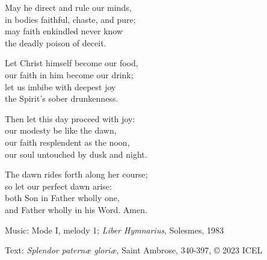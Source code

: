 \hymn



\begin{underhymnverse}
May he direct and rule our minds,\\
in bodies faithful, chaste, and pure;\\
may faith enkindled never know\\
the deadly poison of deceit.

Let Christ himself become our food,\\
our faith in him become our drink;\\
let us imbibe with deepest joy\\
the Spirit’s sober drunkenness.

Then let this day proceed with joy:\\
our modesty be like the dawn,\\
our faith resplendent as the noon,\\
our soul untouched by dusk and night.

The dawn rides forth along her course;\\
so let our perfect dawn arise:\\
both Son in Father wholly one,\\
and Father wholly in his Word. Amen.
\end{underhymnverse}


\begin{hymnsource}
Music: Mode I, melody 1; \emph{Liber Hymnarius}, Solesmes, 1983

Text: \emph{Splendor paternæ gloriæ}, Saint Ambrose, 340-397, © 2023 ICEL
\end{hymnsource}
